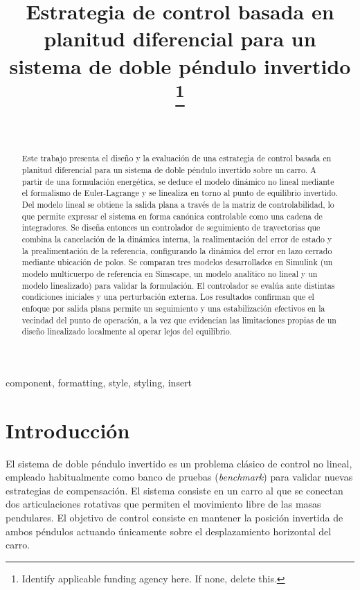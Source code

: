 \documentclass[conference]{IEEEtran}
\begin{document}
\title{Estrategia de control basada en planitud diferencial para un sistema de doble péndulo invertido 
\thanks{Identify applicable funding agency here. If none, delete this.}
}

\author{
\
}

\maketitle

\begin{abstract}
Este trabajo presenta el diseño y la evaluación de una estrategia de control basada en planitud diferencial para un sistema de doble péndulo invertido sobre un carro. A partir de una formulación energética, se deduce el modelo dinámico no lineal mediante el formalismo de Euler-Lagrange y se linealiza en torno al punto de equilibrio invertido. Del modelo lineal se obtiene la salida plana a través de la matriz de controlabilidad, lo que permite expresar el sistema en forma canónica controlable como una cadena de integradores. Se diseña entonces un controlador de seguimiento de trayectorias que combina la cancelación de la dinámica interna, la realimentación del error de estado y la prealimentación de la referencia, configurando la dinámica del error en lazo cerrado mediante ubicación de polos. Se comparan tres modelos desarrollados en Simulink (un modelo multicuerpo de referencia en Simscape, un modelo analítico no lineal y un modelo linealizado) para validar la formulación. El controlador se evalúa ante distintas condiciones iniciales y una perturbación externa. Los resultados confirman que el enfoque por salida plana permite un seguimiento y una estabilización efectivos en la vecindad del punto de operación, a la vez que evidencian las limitaciones propias de un diseño linealizado localmente al operar lejos del equilibrio.
\end{abstract}

\begin{IEEEkeywords}
component, formatting, style, styling, insert
\end{IEEEkeywords}

\section{Introducción}
El sistema de doble péndulo invertido es un problema clásico de control no lineal, empleado habitualmente como banco de pruebas (\textit{benchmark}) para validar nuevas estrategias de compensación. El sistema consiste en un carro al que se conectan dos articulaciones rotativas que permiten el movimiento libre de las masas pendulares. El objetivo de control consiste en mantener la posición invertida de ambos péndulos actuando únicamente sobre el desplazamiento horizontal del carro.\\
\end{document}
